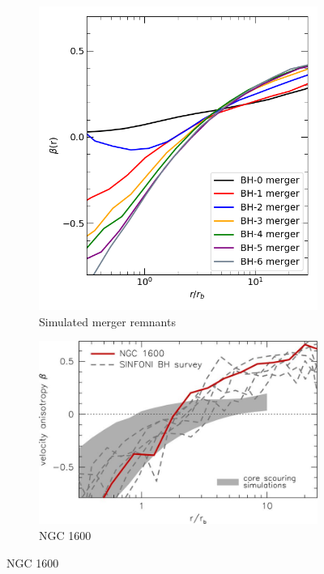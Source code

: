 \documentclass[english, twoside]{HYgradu}
\begin{document}
\begin{figure}
	\centering
	\begin{subfigure}[b]{0.39\textwidth}
		\includegraphics[width=\textwidth]{beta.png}	
		\caption{Simulated merger remnants}
	\end{subfigure}
	\begin{subfigure}[b]{0.60\textwidth}
		\includegraphics[width=\textwidth]{thomas2016.jpg}
		\caption{NGC 1600}
	\end{subfigure}

\end{figure}
\end{document}
